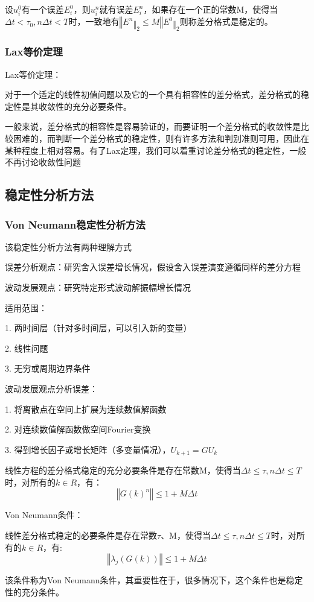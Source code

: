 \documentclass{article}
\begin{document}
设$u_i^0$有一个误差$E_i^0$，则$u_i^n$就有误差$E_i^n$，如果存在一个正的常数M，使得当$\Delta t<\tau_0, n\Delta t<T$时，一致地有$‖E^n‖_2\le M‖E^0‖_2$则称差分格式是稳定的。

\subsubsection{Lax等价定理}
Lax等价定理：

对于一个适定的线性初值问题以及它的一个具有相容性的差分格式，差分格式的稳定性是其收敛性的充分必要条件。

一般来说，差分格式的相容性是容易验证的，而要证明一个差分格式的收敛性是比较困难的，而判断一个差分格式的稳定性，则有许多方法和判别准则可用，因此在某种程度上相对容易。有了Lax定理，我们可以着重讨论差分格式的稳定性，一般不再讨论收敛性问题

\subsection{稳定性分析方法}

\subsubsection{Von Neumann稳定性分析方法}
该稳定性分析方法有两种理解方式

误差分析观点：研究舍入误差增长情况，假设舍入误差演变遵循同样的差分方程

波动发展观点：研究特定形式波动解振幅增长情况

适用范围：

1. 两时间层（针对多时间层，可以引入新的变量）

2. 线性问题

3. 无穷或周期边界条件

波动发展观点分析误差：

1. 将离散点在空间上扩展为连续数值解函数

2. 对连续数值解函数做空间Fourier变换

3. 得到增长因子或增长矩阵（多变量情况），$U_{k+1} = GU_{k}$

线性方程的差分格式稳定的充分必要条件是存在常数M，使得当$\Delta t\le \tau, n\Delta t\le T$时，对所有的$k\in R$，有：
$$‖G(k)^n‖\le1+M\Delta t$$

Von Neumann条件：

线性差分格式稳定的必要条件是存在常数$\tau$、M，使得当$\Delta t\le \tau, n\Delta t\le T$时，对所有的$k\in R$，有:
$$‖\lambda_j(G(k))‖\le1+M\Delta t$$

该条件称为Von Neumann条件，其重要性在于，很多情况下，这个条件也是稳定性的充分条件。
\end{document}
